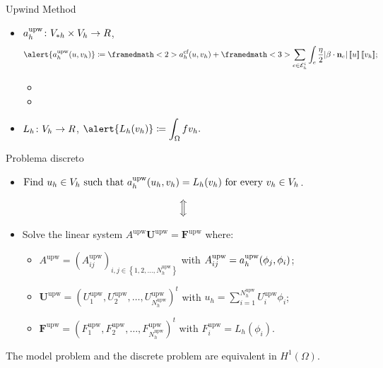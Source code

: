 	\begin{frame}{Upwind Method}
	
	\begin{itemize}\itemsep1em
		\item $a_h^{\text{upw}}\colon V_{*h}\times V_h\to \relax R$, $$\alert{\aupw{u}{v_h}}\coloneqq \framedmath<2>{\displaystyle \acf{u}{v_h}}+\framedmath<3>{\displaystyle \sum_{e\in\E_h^i}\int_e\frac{\eta}{2}|\beta\cdot\mathbf{n}_e|\salto{u}\salto{v_h}};$$
		\begin{itemize}
			\item<2> 
			\item<3> 
		\end{itemize}
		\item $L_h\colon V_h\to\relax R$, $\displaystyle \alert{L_h(v_h)}\coloneqq\int_\Omega f v_h.$
	\end{itemize}
	\end{frame}
	
	\begin{frame}{Problema discreto}
	
	\begin{itemize}
		\item $\text{Find }u_h\in V_h\text{ such that }a_h^{\text{upw}}(u_h,v_h)=L_h(v_h)\text{ for every }v_h\in V_h$.
	\end{itemize}
	\vspace*{0.1cm}
	$$\Big{\Updownarrow}$$
	\vspace*{-0.3cm}
	\begin{itemize}
		\item Solve the linear system $A^{\text{upw}}\mathbf{U}^{\text{upw}}=\mathbf{F}^{\text{upw}}$ where:
		\vspace*{0.3cm}
		\begin{itemize}
			\item $A^{\text{upw}}=\left(A_{ij}^{\text{upw}}\right)_{i,j\in\left\{1,2,\ldots,N_h^{\text{upw}}\right\}}$ with $A_{ij}^{\text{upw}}=a_h^{\text{upw}}(\phi_j,\phi_i)$;
			\item $\mathbf{U}^{\text{upw}}=\left(U_1^{\text{upw}},U_2^{\text{upw}},\ldots,U_{N_h^{\text{upw}}}^{\text{upw}}\right)^t$ with $u_h=\displaystyle\sum_{i=1}^{N_h^{\text{upw}}}U_i^{\text{upw}}\phi_i$;
			\item $\mathbf{F}^{\text{upw}}=\left(F_1^{\text{upw}},F_2^{\text{upw}},\ldots,F_{N_h^{\text{upw}}}^{\text{upw}}\right)^t$ with $F_i^{\text{upw}}=L_h(\phi_i)$.
		\end{itemize}
	\end{itemize}
	
	\vspace*{0.3cm}
	The model problem and the discrete problem are \alert{equivalent} in $H^1(\Omega)$.
	
	\end{frame}
	
